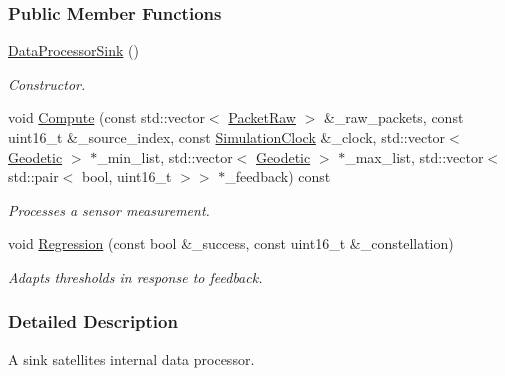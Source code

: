 \subsubsection*{Public Member Functions}
\begin{DoxyCompactItemize}
\item 
\mbox{\label{classosse_1_1collaborate_1_1_data_processor_sink_a8d89873658f5237e951d066ecfdf1c37}} 
\hyperlink{classosse_1_1collaborate_1_1_data_processor_sink_a8d89873658f5237e951d066ecfdf1c37}{Data\+Processor\+Sink} ()
\begin{DoxyCompactList}\small\item\em Constructor. \end{DoxyCompactList}\item 
void \hyperlink{classosse_1_1collaborate_1_1_data_processor_sink_a42b27e2e378f110add6f55406bdbfdd4}{Compute} (const std\+::vector$<$ \hyperlink{classosse_1_1collaborate_1_1_packet_raw}{Packet\+Raw} $>$ \&\+\_\+raw\+\_\+packets, const uint16\+\_\+t \&\+\_\+source\+\_\+index, const \hyperlink{classosse_1_1collaborate_1_1_simulation_clock}{Simulation\+Clock} \&\+\_\+clock, std\+::vector$<$ \hyperlink{classosse_1_1collaborate_1_1_geodetic}{Geodetic} $>$ $\ast$\+\_\+min\+\_\+list, std\+::vector$<$ \hyperlink{classosse_1_1collaborate_1_1_geodetic}{Geodetic} $>$ $\ast$\+\_\+max\+\_\+list, std\+::vector$<$ std\+::pair$<$ bool, uint16\+\_\+t $>$$>$ $\ast$\+\_\+feedback) const
\begin{DoxyCompactList}\small\item\em Processes a sensor measurement. \end{DoxyCompactList}\item 
void \hyperlink{classosse_1_1collaborate_1_1_data_processor_sink_a6f6dce42dffb76a6218f8d2be8bae9c4}{Regression} (const bool \&\+\_\+success, const uint16\+\_\+t \&\+\_\+constellation)
\begin{DoxyCompactList}\small\item\em Adapts thresholds in response to feedback. \end{DoxyCompactList}\end{DoxyCompactItemize}


\subsubsection{Detailed Description}
A sink satellite\textquotesingle{}s internal data processor. 

